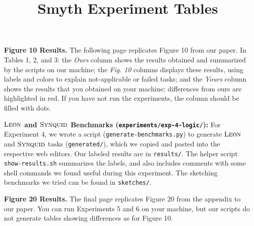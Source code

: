 \documentclass[acmsmall,nonacm]{acmart}
\newcommand{\leon}
  {\ensuremath{\textsc{Leon}}}
\newcommand{\synquid}
  {\ensuremath{\textsc{Synquid}}}
\begin{document}
\title{Smyth Experiment Tables}
\maketitle

\vspace{0.30in}
\noindent
\textbf{Figure 10 Results.}
%
The following page replicates Figure 10 from our paper.
%
In Tables 1, 2, and 3:
%
the \textit{Ours} column shows the results obtained and summarized by
the scripts on our machine;
%
the \textit{Fig. 10} columns displays these results, using labels and
colors to explain not-applicable or failed tasks; and
%
the \textit{Yours} column shows the results that you obtained
on your machine; differences from ours are highlighted in red.
%
If you have not run the experiments, the column should be filled with dots.


\vspace{0.30in}
%
\noindent
%
\textbf{\leon{} and \synquid{} Benchmarks (\texttt{experiments/exp-4-logic/}):}
%
For Experiment 4, we wrote a script
%
(\texttt{generate-benchmarks.py})
%
to generate \leon{} and \synquid{} tasks
%
(\texttt{generated/}),
%
which we copied and pasted into the respective web editors.
%
Our labeled results are in \texttt{results/}.
%
The helper script \texttt{show-results.sh} summarizes the labels,
and also includes comments with some shell commands we found useful during
this experiment.
%
The sketching benchmarks we tried
can be found in \texttt{sketches/}.

\vspace{0.30in}
\noindent
\textbf{Figure 20 Results.}
%
The final page replicates Figure 20 from the appendix to our paper.
%
You can run Experiments 5 and 6 on your machine, but our scripts do not
generate tables showing differences as for Figure 10.

\clearpage

\setcounter{figure}{9}


\setcounter{figure}{0}





\setcounter{figure}{19}

\end{document}
